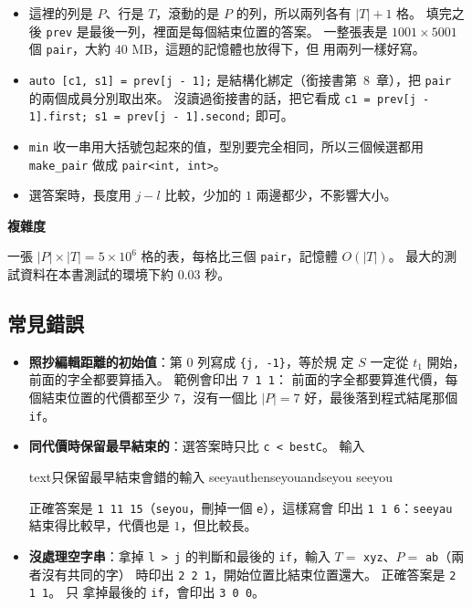 
\begin{itemize}
\item 這裡的列是 $P$、行是 $T$，滾動的是 $P$ 的列，所以兩列各有 $|T| + 1$ 格。
填完之後 \texttt{prev} 是最後一列，裡面是每個結束位置的答案。 一整張表是
$1001 \times 5001$ 個 \texttt{pair}，大約 $40$ MB，這題的記憶體也放得下，但
用兩列一樣好寫。
\item \texttt{auto [c1, s1] = prev[j - 1];} 是結構化綁定（銜接書第~8~章），把
\texttt{pair} 的兩個成員分別取出來。 沒讀過銜接書的話，把它看成
\texttt{c1 = prev[j - 1].first; s1 = prev[j - 1].second;} 即可。
\item \texttt{min} 收一串用大括號包起來的值，型別要完全相同，所以三個候選都用
\texttt{make\_pair} 做成 \texttt{pair<int, int>}。
\item 選答案時，長度用 $j - l$ 比較，少加的 $1$ 兩邊都少，不影響大小。
\end{itemize}

\textbf{複雜度}

一張 $|P| \times |T| = 5 \times 10^6$ 格的表，每格比三個 \texttt{pair}，記憶體
$O(|T|)$。 最大的測試資料在本書測試的環境下約 $0.03$ 秒。

\subsection{常見錯誤}

\begin{itemize}
\item \textbf{照抄編輯距離的初始值}：第 $0$ 列寫成 \texttt{\{j, -1\}}，等於規
定 $S$ 一定從 $t_1$ 開始，前面的字全都要算插入。 範例會印出 \texttt{7 1 1}：
前面的字全都要算進代價，每個結束位置的代價都至少 $7$，沒有一個比
$|P| = 7$ 好，最後落到程式結尾那個 \texttt{if}。
\item \textbf{同代價時保留最早結束的}：選答案時只比 \texttt{c < bestC}。 輸入
\begin{code}{text}{只保留最早結束會錯的輸入}
seeyauthenseyouandseyou
seeyou
\end{code}
正確答案是 \texttt{1 11 15}（\texttt{seyou}，刪掉一個 \texttt{e}），這樣寫會
印出 \texttt{1 1 6}：\texttt{seeyau} 結束得比較早，代價也是 $1$，但比較長。
\item \textbf{沒處理空字串}：拿掉 \texttt{l > j} 的判斷和最後的
\texttt{if}，輸入 $T = $ \texttt{xyz}、$P = $ \texttt{ab}（兩者沒有共同的字）
時印出 \texttt{2 2 1}，開始位置比結束位置還大。 正確答案是 \texttt{2 1 1}。 只
拿掉最後的 \texttt{if}，會印出 \texttt{3 0 0}。
\end{itemize}

